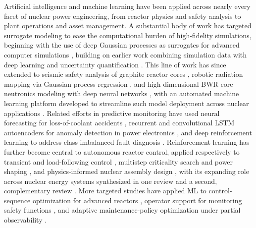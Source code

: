 \documentclass{style/nseJournal}
\begin{document}
Artificial intelligence and machine learning have been applied across nearly every facet of nuclear power engineering, from reactor physics and safety analysis to plant operations and asset management. A substantial body of work has targeted surrogate modeling to ease the computational burden of high-fidelity simulations, beginning with the use of deep Gaussian processes as surrogates for advanced computer simulations \cite{radaideh2020surrogate}, building on earlier work combining simulation data with deep learning and uncertainty quantification \cite{radaideh2019combining,radaideh2020analyzing}. This line of work has since extended to seismic safety analysis of graphite reactor cores \cite{jones2022surrogate}, robotic radiation mapping via Gaussian process regression \cite{west2021use}, and high-dimensional BWR core neutronics modeling with deep neural networks \cite{saleem2020application}, with an automated machine learning platform developed to streamline such model deployment across nuclear applications \cite{myers2025pymaise}. Related efforts in predictive monitoring have used neural forecasting for loss-of-coolant accidents \cite{radaideh2020neural}, recurrent and convolutional LSTM autoencoders for anomaly detection in power electronics \cite{radaideh2022time}, and deep reinforcement learning to address class-imbalanced fault diagnosis \cite{zhong2023deep}. Reinforcement learning has further become central to autonomous reactor control, applied respectively to transient and load-following control \cite{tunkle2025nuclear}, multistep criticality search and power shaping \cite{radaideh2025multistep}, and physics-informed nuclear assembly design \cite{radaideh2021physics}, with its expanding role across nuclear energy systems synthesized in one review \cite{liu2024applications} and a second, complementary review \cite{gong2024possibilities}. More targeted studies have applied ML to control-sequence optimization for advanced reactors \cite{nguyen2024reinforcement}, operator support for monitoring safety functions \cite{park2020providing}, and adaptive maintenance-policy optimization under partial observability \cite{zhao2022reinforcement}.
\end{document}

